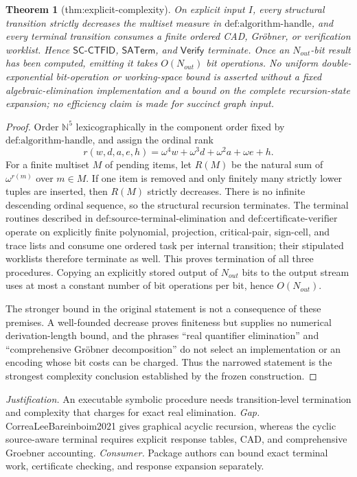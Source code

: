 \documentclass{article}
\newtheorem{theorem}{Theorem}
\begin{document}
\begin{theorem}[thm:explicit-complexity]\label{thm:explicit-complexity}
On explicit input \(I\), every structural transition strictly decreases the multiset measure in \(\text{def:algorithm-handle}\), and every terminal transition consumes a finite ordered CAD, Gr\"obner, or verification worklist.  Hence \(\mathsf{SC\mbox{-}CTFID}\), \(\mathsf{SATerm}\), and \(\mathsf{Verify}\) terminate.  Once an \(N_{out}\)-bit result has been computed, emitting it takes \(O(N_{out})\) bit operations.  No uniform double-exponential bit-operation or working-space bound is asserted without a fixed algebraic-elimination implementation and a bound on the complete recursion-state expansion; no efficiency claim is made for succinct graph input.
\end{theorem}
\begin{proof}
Order \(\mathbb N^5\) lexicographically in the component order fixed by \(\text{def:algorithm-handle}\), and assign the ordinal rank
\[
 r(w,d,a,e,h)=\omega^4w+\omega^3d+\omega^2a+\omega e+h.
\]
For a finite multiset \(M\) of pending items, let \(R(M)\) be the natural sum of \(\omega^{r(m)}\) over \(m\in M\).  If one item is removed and only finitely many strictly lower tuples are inserted, then \(R(M)\) strictly decreases.  There is no infinite descending ordinal sequence, so the structural recursion terminates.  The terminal routines described in \(\text{def:source-terminal-elimination}\) and \(\text{def:certificate-verifier}\) operate on explicitly finite polynomial, projection, critical-pair, sign-cell, and trace lists and consume one ordered task per internal transition; their stipulated worklists therefore terminate as well.  This proves termination of all three procedures.  Copying an explicitly stored output of \(N_{out}\) bits to the output stream uses at most a constant number of bit operations per bit, hence \(O(N_{out})\).

The stronger bound in the original statement is not a consequence of these premises.  A well-founded decrease proves finiteness but supplies no numerical derivation-length bound, and the phrases ``real quantifier elimination'' and ``comprehensive Gr\"obner decomposition'' do not select an implementation or an encoding whose bit costs can be charged.  Thus the narrowed statement is the strongest complexity conclusion established by the frozen construction.
\end{proof}
\par\smallskip\noindent \textit{Justification.} An executable symbolic procedure needs transition-level termination and complexity that charges for exact real elimination. \textit{Gap.} CorreaLeeBareinboim2021 gives graphical acyclic recursion, whereas the cyclic source-aware terminal requires explicit response tables, CAD, and comprehensive Groebner accounting. \textit{Consumer.} Package authors can bound exact terminal work, certificate checking, and response expansion separately.
\end{document}
